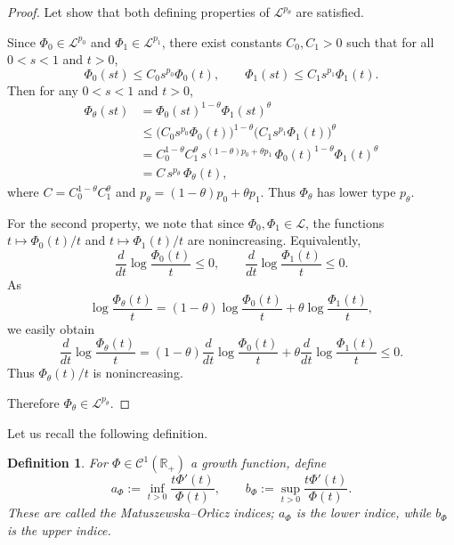 \documentclass[12pt]{amsart}
\newtheorem{definition}{Definition}
\newcommand{\Lc}{\mathcal{L}}
\newcommand{\R}{\mathbb{R}}
\begin{document}
\begin{proof}
Let show that both defining properties of $\Lc^{p_\theta}$ are satisfied.

Since $\Phi_0\in\Lc^{p_0}$ and $\Phi_1\in\Lc^{p_1}$, there exist constants $C_0,C_1>0$ such that for all $0<s<1$ and $t>0$,
\[
\Phi_0(st)\le C_0 s^{p_0}\Phi_0(t),\qquad
\Phi_1(st)\le C_1 s^{p_1}\Phi_1(t).
\]
Then for any $0<s<1$ and $t>0$,
\begin{align*}
\Phi_\theta(st)
&= \Phi_0(st)^{1-\theta}\Phi_1(st)^{\theta} \\
&\le \bigl(C_0 s^{p_0}\Phi_0(t)\bigr)^{1-\theta}
   \bigl(C_1 s^{p_1}\Phi_1(t)\bigr)^{\theta} \\
&= C_0^{1-\theta}C_1^{\theta}\,
   s^{(1-\theta)p_0+\theta p_1}\,
   \Phi_0(t)^{1-\theta}\Phi_1(t)^{\theta} \\
&= C\, s^{p_\theta}\,\Phi_\theta(t),
\end{align*}
where $C=C_0^{1-\theta}C_1^{\theta}$ and $p_\theta=(1-\theta)p_0+\theta p_1$.
Thus $\Phi_\theta$ has lower type $p_\theta$.

For the second property, we note that
since $\Phi_0,\Phi_1\in\Lc$, the functions $t\mapsto\Phi_0(t)/t$ and $t\mapsto\Phi_1(t)/t$ are nonincreasing. Equivalently,
\[
\frac{d}{dt}\log\frac{\Phi_0(t)}{t}\le 0,\qquad
\frac{d}{dt}\log\frac{\Phi_1(t)}{t}\le 0.
\]
As
\[
\log\frac{\Phi_\theta(t)}{t}
= (1-\theta)\log\frac{\Phi_0(t)}{t}
+ \theta\log\frac{\Phi_1(t)}{t},
\]
we easily obtain
\[
\frac{d}{dt}\log\frac{\Phi_\theta(t)}{t}
= (1-\theta)\frac{d}{dt}\log\frac{\Phi_0(t)}{t}
+ \theta\frac{d}{dt}\log\frac{\Phi_1(t)}{t}
\le 0.
\]
Thus $\Phi_\theta(t)/t$ is nonincreasing.

Therefore $\Phi_\theta\in\Lc^{p_\theta}$.
\end{proof}
Let us recall the following definition.
\begin{definition}
For $\Phi\in\mathcal{C}^1(\R_+)$ a growth function, define
\[
a_\Phi:=\inf_{t>0}\frac{t\Phi'(t)}{\Phi(t)},\qquad
b_\Phi:=\sup_{t>0}\frac{t\Phi'(t)}{\Phi(t)}.
\]
These are called the Matuszewska--Orlicz indices; $a_\Phi$ is the lower indice, while $b_\Phi$ is the upper indice.
\end{definition}
\end{document}
